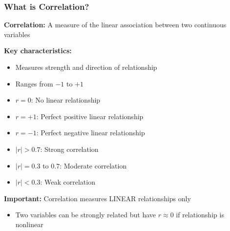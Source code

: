\documentclass{beamer}
\begin{document}
\begin{frame}
\frametitle{What is Correlation?}
\textbf{Correlation:} A measure of the linear association between two continuous variables

\vspace{0.5cm}
\textbf{Key characteristics:}
\begin{itemize}
\item Measures strength and direction of relationship
\item Ranges from $-1$ to $+1$
\item $r = 0$: No linear relationship
\item $r = +1$: Perfect positive linear relationship
\item $r = -1$: Perfect negative linear relationship
\item $|r| > 0.7$: Strong correlation
\item $|r| = 0.3$ to $0.7$: Moderate correlation
\item $|r| < 0.3$: Weak correlation
\end{itemize}

\vspace{0.3cm}
\textbf{Important:} Correlation measures LINEAR relationships only
\begin{itemize}
\item Two variables can be strongly related but have $r \approx 0$ if relationship is nonlinear
\end{itemize}
\end{frame}
\end{document}
